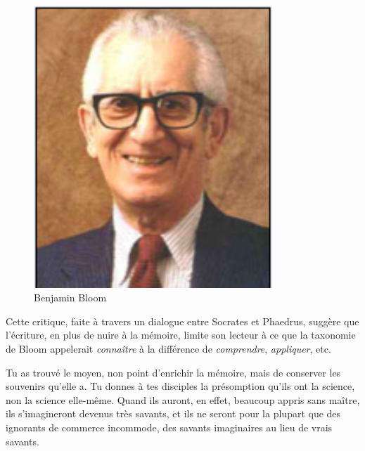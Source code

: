 \begin{minipage}[H]{0.3\linewidth}
  \begin{figure}[H]
  \centering
  \includegraphics[width=0.8\textwidth]{../resources/illustrations/bloom_face}
  \caption{Benjamin Bloom}
  \end{figure}
\end{minipage}
\begin{minipage}[H]{0.69\linewidth}
Cette critique, faite à travers un dialogue entre Socrates et Phaedrus, suggère que l'écriture, en plus de nuire à la mémoire, limite son lecteur à ce que la taxonomie de Bloom\cite{tax-bloom} appelerait \emph{connaître} à la différence de \emph{comprendre}, \emph{appliquer}, etc. 
\vspace{1cm}
\end{minipage}

\begin{coolquote}
Tu as trouvé le moyen, non point d'enrichir la mémoire, mais de conserver les souvenirs qu'elle a. Tu donnes à tes disciples la présomption qu'ils ont la science, non la science elle-même. Quand ils auront, en effet, beaucoup appris sans maître, ils s'imagineront devenus très savants, et ils ne seront pour la plupart que des ignorants de commerce incommode, des savants imaginaires au lieu de vrais savants.
\end{coolquote}

